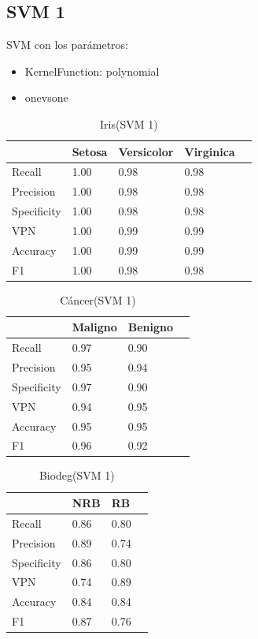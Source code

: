 \documentclass[a4paper,openwrite,12pt]{article}
\begin{document}
\subsection{SVM 1}
SVM con los parámetros:
\begin{itemize}
    \item KernelFunction: polynomial
    \item onevsone
\end{itemize}

\begin{table}[H]
\centering
\begin{tabular}{@{}lllll@{}}
\toprule
            & Setosa & Versicolor & Virginica &  \\ \midrule
Recall      & 1.00   & 0.98       & 0.98      &  \\
Precision   & 1.00   & 0.98       & 0.98      &  \\
Specificity & 1.00   & 0.98       & 0.98      &  \\
VPN         & 1.00   & 0.99       & 0.99      &  \\
Accuracy    & 1.00   & 0.99       & 0.99      &  \\
F1          & 1.00   & 0.98       & 0.98      &  \\ \bottomrule
\end{tabular}
\caption{Iris(SVM 1)}
\end{table}


\begin{table}[H]
\centering
\begin{tabular}{@{}llll@{}}
\toprule
            & Maligno & Benigno &  \\ \midrule
Recall      & 0.97    & 0.90    &  \\
Precision   & 0.95    & 0.94    &  \\
Specificity & 0.97    & 0.90    &  \\
VPN         & 0.94    & 0.95    &  \\
Accuracy    & 0.95    & 0.95    &  \\
F1          & 0.96    & 0.92    &  \\ \bottomrule
\end{tabular}
\caption{Cáncer(SVM 1)}
\end{table}


\begin{table}[H]
\centering
\begin{tabular}{@{}llll@{}}
\toprule
            & NRB &   RB &  \\ \midrule
Recall      & 0.86    & 0.80    &  \\
Precision   & 0.89    & 0.74    &  \\
Specificity & 0.86    & 0.80    &  \\
VPN         & 0.74    & 0.89    &  \\
Accuracy    & 0.84    & 0.84    &  \\
F1          & 0.87    & 0.76    &  \\ \bottomrule
\end{tabular}
\caption{Biodeg(SVM 1)}
\end{table}
\end{document}
